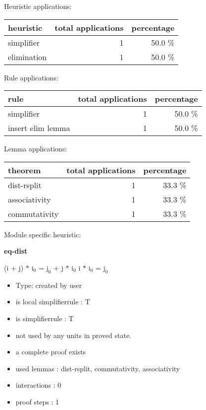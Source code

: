 \documentclass[a4paper]{article}
\begin{document}
\medskip


Heuristic applications:

\begin{supertabular}{l|r|r}
heuristic	& total applications & percentage \\ \hline
simplifier & 1 & 50.0 \% \\
elimination & 1 & 50.0 \% \\

\end{supertabular}

Rule applications:

\begin{supertabular}{l|r|r}
rule	        & total applications & percentage \\ \hline
simplifier & 1 & 50.0 \% \\
insert elim lemma & 1 & 50.0 \% \\

\end{supertabular}

Lemma applications:

\begin{supertabular}{l|r|r}
theorem	        & total applications & percentage \\ \hline
dist-rsplit & 1 & 33.3 \% \\
associativity & 1 & 33.3 \% \\
commutativity & 1 & 33.3 \% \\

\end{supertabular}

Module specific heuristic:

\pagebreak

{\LARGE\bf eq-dist}\label{lemma-eq-dist}

\medskip

 \Fol (i + j) $*$ $\mbox{i}_{0}$ = $\mbox{j}_{0}$ + j $*$ $\mbox{i}_{0}$ \Equiv i $*$ $\mbox{i}_{0}$ = $\mbox{j}_{0}$

\begin{itemize}

\item Type: created by user

\item is local simplifierrule : T
\item is simplifierrule : T
\item not used by any units in proved state.
\item       a complete proof exists
\item       used lemmas  : dist-rsplit, commutativity, associativity
\item       interactions : 0
\item       proof steps  : 1
\end{itemize}
\end{document}

